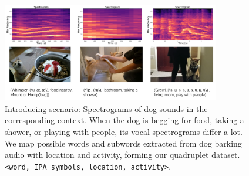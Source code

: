\begin{figure}[t]
	\centering
	\includegraphics[width=0.85\textwidth]{images/intro.jpg}
	\caption{Introducing scenario: Spectrograms of dog sounds in the corresponding context. When the dog is begging for food, taking a shower, or playing with people, its vocal spectrograms differ a lot. We map possible words and subwords extracted from dog barking audio with location and activity, forming our quadruplet dataset.  %
\texttt{<word, IPA symbols, location, activity>}.
	} %
	\label{fig:intropic}
\end{figure}

